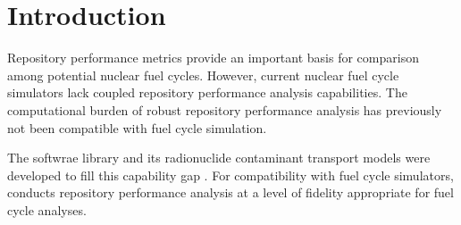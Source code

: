 \section{Introduction}\label{sec:introduction}
Repository performance metrics provide an important basis for comparison among 
potential nuclear fuel cycles. However, current nuclear fuel cycle simulators 
lack coupled repository performance analysis capabilities.  The computational 
burden of robust repository performance analysis has previously not been 
compatible with fuel cycle simulation.

The \Cyder softwrae library and its radionuclide contaminant transport models 
were  developed to fill this capability gap \cite{huff_cyder_2013}. For 
compatibility with fuel cycle simulators, \Cyder  conducts repository 
performance analysis at a level of fidelity appropriate for fuel cycle 
analyses.


